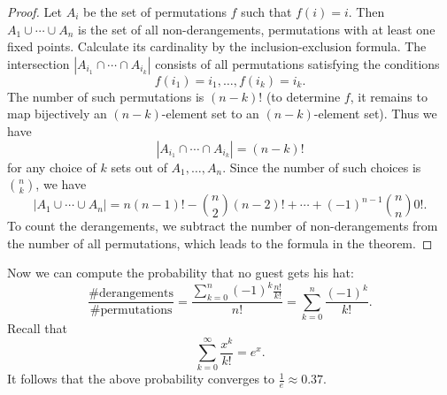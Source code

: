 \begin{proof}
Let $A_i$ be the set of permutations $f$ such that $f(i) = i$.
Then $A_1 \cup \cdots \cup A_n$ is the set of all non-derangements, permutations with at least one fixed points.
Calculate its cardinality by the inclusion-exclusion formula.
The intersection $|A_{i_1} \cap \cdots \cap A_{i_k}|$ consists of all permutations satisfying the conditions
\[
f(i_1) = i_1, \ldots, f(i_k) = i_k.
\]
The number of such permutations is $(n-k)!$
(to determine $f$, it remains to map bijectively an $(n-k)$-element set to an $(n-k)$-element set).
Thus we have
\[
|A_{i_1} \cap \cdots \cap A_{i_k}| = (n-k)!
\]
for any choice of $k$ sets out of $A_1, \ldots, A_n$.
Since the number of such choices is $\binom{n}{k}$, we have
\[
|A_1 \cup \cdots \cup A_n| = n (n-1)! - \binom{n}{2} (n-2)! + \cdots + (-1)^{n-1} \binom{n}{n} 0!.
\]
To count the derangements, we subtract the number of non-derangements from the number of all permutations,
which leads to the formula in the theorem.
\end{proof}

Now we can compute the probability that no guest gets his hat:
\[
\frac{\#\text{derangements}}{\#\text{permutations}} = \frac{\sum_{k=0}^n (-1)^k \frac{n!}{k!}}{n!} = \sum_{k=0}^n \frac{(-1)^k}{k!}.
\]
Recall that
\[
\sum_{k=0}^\infty \frac{x^k}{k!} = e^x.
\]
It follows that the above probability converges to $\frac{1}{e} \approx 0.37$.

